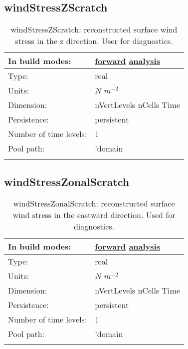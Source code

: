 \subsection[windStressZScratch]{windStressZScratch}
\label{subsec:var_sec_scratch_windStressZScratch}
\begin{center}
\begin{longtable}{| p{2.0in} | p{4.0in} |}
        \hline 
        In build modes: & \hyperref[subsec:forward_var_tab_scratch]{forward} \hyperref[subsec:analysis_var_tab_scratch]{analysis} \\
        \hline 
        Type: & real \\
        \hline 
        Units: & $N$ $m^{-2}$ \\
        \hline 
        Dimension: & nVertLevels nCells Time \\
        \hline 
        Persistence: & persistent \\
        \hline 
        Number of time levels: & 1 \\
        \hline 
            Pool path: & 'domain %
 \\
		 \hline 
    \caption{windStressZScratch: reconstructed surface wind stress in the z direction. User for diagnostics.}
\end{longtable}
\end{center}
\subsection[windStressZonalScratch]{windStressZonalScratch}
\label{subsec:var_sec_scratch_windStressZonalScratch}
\begin{center}
\begin{longtable}{| p{2.0in} | p{4.0in} |}
        \hline 
        In build modes: & \hyperref[subsec:forward_var_tab_scratch]{forward} \hyperref[subsec:analysis_var_tab_scratch]{analysis} \\
        \hline 
        Type: & real \\
        \hline 
        Units: & $N$ $m^{-2}$ \\
        \hline 
        Dimension: & nVertLevels nCells Time \\
        \hline 
        Persistence: & persistent \\
        \hline 
        Number of time levels: & 1 \\
        \hline 
            Pool path: & 'domain %
 \\
		 \hline 
    \caption{windStressZonalScratch: reconstructed surface wind stress in the eastward direction. Used for diagnostics.}
\end{longtable}
\end{center}
